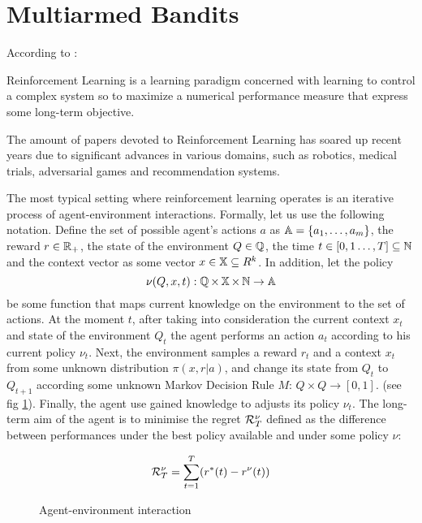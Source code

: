 
\section{Multiarmed Bandits}
According to \cite{Szepesvari2010}: 

\begin{definition}Reinforcement Learning is a learning paradigm concerned with learning to control a complex system so to maximize a numerical performance measure that express some long-term objective.    
\end{definition}

 The amount of papers devoted to Reinforcement Learning has soared up recent years due to significant advances in various domains, such as robotics, medical trials, adversarial games and recommendation systems.

 The most typical setting where reinforcement learning operates is an iterative process of agent-environment interactions. Formally, let us use the following notation. Define the set of possible agent's actions $a$ as $\operatorname{\mathbb{A}} = \{a_1, \dots, a_m \}$, the reward $r \in \operatorname{\mathbb{R}}_{+}$, the state of the environment $Q \in \operatorname{\mathbb{Q}}$, the time $t \in [0, 1 \dots, T] \subseteq \operatorname{\mathbb{N}}$ and the context vector as some vector $x \in \operatorname{\mathbb{X}} \subseteq R^k$. In addition, let the policy $$\nu(Q, x, t):\operatorname{\mathbb{Q}} \times \operatorname{\mathbb{X}} \times \operatorname{\mathbb{N}} \to \operatorname{\mathbb{A}}$$ be some function that maps current knowledge on the environment to the set of actions. At the moment $t$, after taking into consideration the current context $x_t$ and state of the environment $Q_t$ the agent performs an action $a_t$ according to his current policy $\nu_t$. Next, the environment samples a reward $r_t$ and a context $x_t$ from some unknown distribution $\pi(x,r|a)$, and change its state from $Q_t$ to $Q_{t+1}$ according some unknown Markov Decision Rule $M:\, Q \times Q \to [0, 1]$. (see fig \ref{fig:MAB_scheme}). Finally, the agent use gained knowledge to adjusts its policy $\nu_t$. The long-term aim of the agent is to minimise the regret ${\cal R}^\nu_T$ defined as the difference between performances under the best policy available and under some policy $\nu$:
 
\[
        {\cal R}^\nu_T = \sum_{t=1}^T(r^*(t) - r^{\nu}(t))
\]
 
\begin{figure}
    \centering
    \label{fig:MAB_scheme}
        \caption{Agent-environment interaction}
\end{figure}
 
